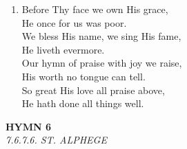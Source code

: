 \begin{enumerate}
    \item Before Thy face we own His grace, \\
        He once for us was poor. \\
        We bless His name, we sing His fame, \\
        He liveth evermore. \\
        Our hymn of praise with joy we raise, \\
        His worth no tongue can tell. \\
        So great His love all praise above, \\
        He hath done all things well.

\end{enumerate}

\newpage
\begin{center}
    {\Large \textbf{HYMN 6}}
    \\
    \textit{7.6.7.6. ST. ALPHEGE}
\end{center}
\vspace{1em}

